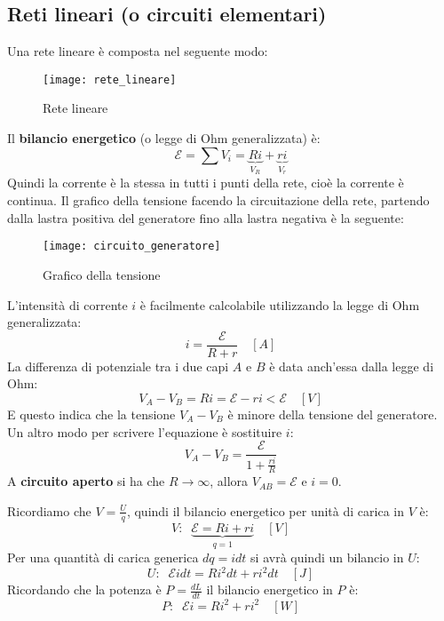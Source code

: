 \documentclass[a4paper]{article}
\begin{document}
\subsection{Reti lineari (o circuiti elementari)}
Una rete lineare è composta nel seguente modo:
\begin{figure}[H]
  \centering
  \texttt{[image: rete\_lineare]}
  \caption{Rete lineare}
\end{figure}
\noindent
Il \textbf{bilancio energetico} (o legge di Ohm generalizzata) è:
\[
  \mathcal{E} = \sum V_i = \underbrace{Ri}_{V_R} + \underbrace{ri}_{V_r}
\] 
Quindi la corrente è la stessa in tutti i punti della rete, cioè la corrente è
continua. Il grafico della tensione facendo la circuitazione della rete, partendo dalla
lastra positiva del generatore fino alla lastra negativa è la seguente:
\begin{figure}[H]
  \centering
  \texttt{[image: circuito\_generatore]}
  \caption{Grafico della tensione}
\end{figure}
\noindent
L'intensità di corrente \( i \) è facilmente calcolabile utilizzando la legge di Ohm
generalizzata:
\[
  i = \frac{\mathcal{E}}{R + r} \quad \left[ A \right]
\] 
La differenza di potenziale tra i due capi \( A \) e \( B \) è data anch'essa dalla
legge di Ohm:
\[
  V_A - V_B = Ri = \mathcal{E} - r i < \mathcal{E} \quad \left[ V \right]
\] 
E questo indica che la tensione \( V_A - V_B \) è minore della tensione del generatore.
Un altro modo per scrivere l'equazione è sostituire \( i \):
\[
  V_A - V_B = \frac{\mathcal{E}}{1 + \frac{ri}{R}}
\] 
A \textbf{circuito aperto} si ha che \( R \to \infty \), allora \( V_{AB} = \mathcal{E} \)
e \( i = 0 \).

\begin{define}
  Ricordiamo che \( V = \frac{U}{q} \), quindi il bilancio energetico per unità di carica in \( V \) è:
  \[
    V: \;\; \underbrace{\mathcal{E} = Ri + ri}_{q=1} \quad \left[ V \right]
  \] 
  Per una quantità di carica generica \( dq = idt \) si avrà quindi un bilancio in \( U \):
  \[
    U: \;\; \mathcal{E}idt = R i^2 dt + r i^2 dt \quad \left[ J \right]
  \] 
  Ricordando che la potenza è \( P = \frac{dL}{dt} \) il bilancio energetico in \( P \) è:
  \[
    P: \;\; \mathcal{E}i = R i^2 + r i^2 \quad \left[ W \right]
  \] 
\end{define}
\end{document}
